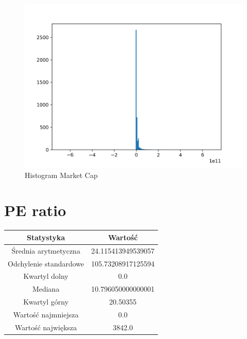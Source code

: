 \documentclass{article}
\begin{document}
\begin{figure}[h!]
    \includegraphics[width=\linewidth]{variables/Market Cap.png}
    \caption{Histogram Market Cap }
\end{figure}\section{ PE ratio }

\begin{center}
    \begin{tabular}{|c | c|} 
    \hline
    Statystyka & Wartość \\
    \hline\hline
    Średnia arytmetyczna & 24.115413949539057 \\ 
    \hline
    Odchylenie standardowe & 105.73208917125594 \\
    \hline
    Kwartyl dolny & 0.0 \\
    \hline
    Mediana & 10.796050000000001 \\
    \hline
    Kwartyl górny & 20.50355 \\
    \hline
    Wartość najmniejsza & 0.0 \\
    \hline
    Wartość największa & 3842.0 \\
    \hline
   \end{tabular}
\end{center}
\end{document}
